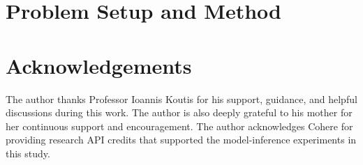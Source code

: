 \documentclass[smallextended]{svjour3}
\begin{document}


\section{Problem Setup and Method}
\label{sec:problem_setup_method}


























\section*{Acknowledgements}
The author thanks Professor Ioannis Koutis for his support, guidance, and helpful
discussions during this work. The author is also deeply grateful to his mother for
her continuous support and encouragement. The author acknowledges Cohere for
providing research API credits that supported the model-inference experiments in
this study.




\clearpage

\end{document}
